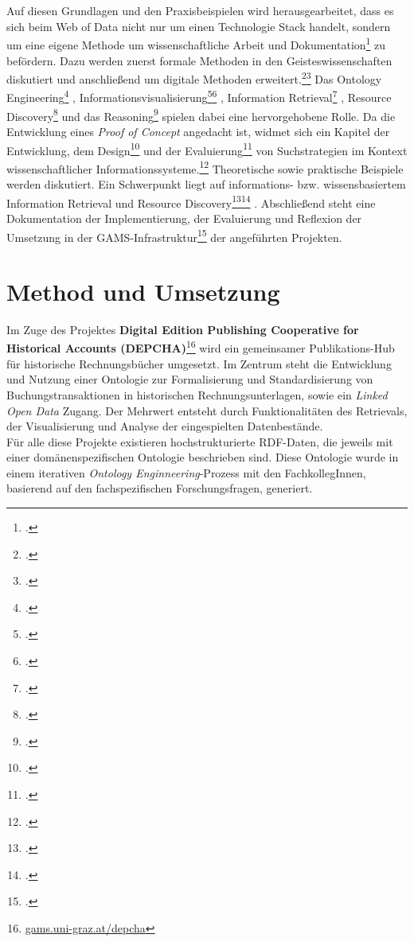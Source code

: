 \documentclass[12pt,a4paper]{article}
\begin{document}
\\
\\
Auf diesen Grundlagen und den Praxisbeispielen wird herausgearbeitet, dass es sich beim Web of Data nicht nur um einen Technologie Stack handelt, sondern um eine eigene Methode um wissenschaftliche Arbeit und Dokumentation\footcite{latour2016zirkulierende} zu befördern. Dazu werden zuerst formale Methoden in den Geisteswissenschaften diskutiert und anschließend um digitale Methoden erweitert.\footcite{thaller2017digital}\footcite{thaller2017ungefahre} Das Ontology Engineering\footcite{hitzler2016ontology} , Informationsvisualisierung\footcite{rehbein2017informationsvisualisierung}\footcite{jager2015informationsvisualisierung} , Information Retrieval\footcite{baezayates2011retrieval} , Resource Discovery\footcite{wiesenmueller2016resourcediscovery} und das Reasoning\footcite{bursztyn2015reasoning} spielen dabei eine hervorgehobene Rolle.
Da die Entwicklung eines \textit{Proof of Concept} angedacht ist, widmet sich ein Kapitel der Entwicklung, dem Design\footcite{shneiderman2016designing} und der Evaluierung\footcite{buttcher2016information} von Suchstrategien im Kontext wissenschaftlicher Informationssysteme.\footcite{Khalili2016Adaptive} Theoretische sowie praktische Beispiele werden diskutiert. Ein Schwerpunkt liegt auf informations- bzw. wissensbasiertem Information Retrieval und Resource Discovery\footcite{GarciaKMD13}\footcite{DamianoLL14} .
Abschließend steht eine Dokumentation der Implementierung, der Evaluierung und Reflexion der Umsetzung in der GAMS-Infrastruktur\footcite{stigler2018gams} der angeführten Projekten.

\section{Method und Umsetzung}


Im Zuge des Projektes \textbf{Digital Edition Publishing Cooperative for Historical Accounts (DEPCHA)}\footnote{\url{gams.uni-graz.at/depcha}} wird ein gemeinsamer Publikations-Hub für historische Rechnungsbücher umgesetzt. Im Zentrum steht die Entwicklung und Nutzung einer Ontologie zur Formalisierung und Standardisierung von Buchungstransaktionen in historischen Rechnungsunterlagen, sowie ein \textit{Linked Open Data} Zugang. Der Mehrwert entsteht durch Funktionalitäten des Retrievals, der Visualisierung und Analyse der eingespielten Datenbestände.
\\
Für alle diese Projekte existieren hochstrukturierte RDF-Daten, die jeweils mit einer domänenspezifischen Ontologie beschrieben sind. Diese Ontologie wurde in einem iterativen \textit{Ontology Enginneering}-Prozess mit den FachkollegInnen, basierend auf den fachspezifischen Forschungsfragen, generiert.
\end{document}
